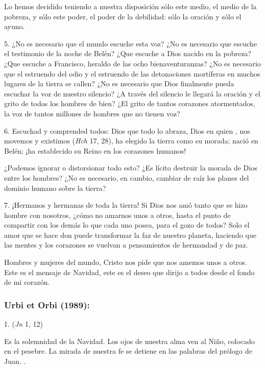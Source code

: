 \begin{body}
\begin{body}
		Lo hemos decidido teniendo a nuestra disposición sólo este medio, el medio de la pobreza, y sólo este poder, el poder de la debilidad: sólo la oración y sólo el ayuno.

		5. ¿No es necesario que el mundo escuche esta voz? ¿No es necesario que escuche el testimonio de la noche de Belén? ¿Que escuche a Dios nacido en la pobreza? ¿Que escuche a Francisco, heraldo de las ocho bienaventuranzas? ¿No es necesario que el estruendo del odio y el estruendo de las detonaciones mortíferas en muchos lugares de la tierra se callen? ¿No es necesario que Dios finalmente pueda escuchar la voz de nuestro silencio? ¿A través del silencio le llegará la oración y el grito de todos los hombres de bien? ¿El grito de tantos corazones atormentados, la voz de tantos millones de hombres que no tienen voz?

		6. Escuchad y comprended todos: Dios que todo lo abraza, Dios en quien , nos movemos y existimos (\emph{Hch} 17, 28), ha elegido la tierra como su morada; nació en Belén; ¡ha establecido su Reino en los corazones humanos!

		¿Podemos ignorar o distorsionar todo esto? ¿Es lícito destruir la morada de Dios entre los hombres? ¿No es necesario, en cambio, cambiar de raíz los planes del dominio humano sobre la tierra?

		7. ¡Hermanos y hermanas de toda la tierra! Si Dios nos amó tanto que se hizo hombre con nosotros, ¿cómo no amarnos unos a otros, hasta el punto de compartir con los demás lo que cada uno posea, para el gozo de todos? Solo el amor que se hace don puede transformar la faz de nuestro planeta, haciendo que las mentes y los corazones se vuelvan a pensamientos de hermandad y de paz.

		Hombres y mujeres del mundo, Cristo nos pide que nos amemos unos a otros. Este es el mensaje de Navidad, este es el deseo que dirijo a todos desde el fondo de mi corazón.
	\end{body}

	\subsubsection{Urbi et Orbi (1989):}

	\begin{body}
		1.  (\emph{Jn} 1, 12)

		Es la solemnidad de la Navidad. Los ojos de nuestra alma ven al Niño, colocado en el pesebre. La mirada de nuestra fe se detiene en las palabras del prólogo de Juan. .


\end{body}
\end{body}
